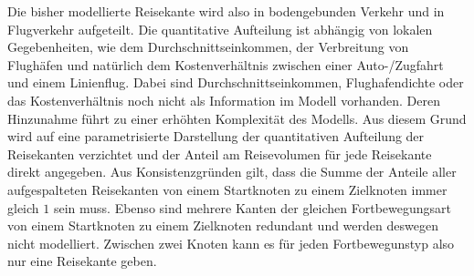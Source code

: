 Die bisher modellierte Reisekante wird also in bodengebunden Verkehr und in Flugverkehr aufgeteilt. Die quantitative Aufteilung ist abhängig von lokalen Gegebenheiten, wie dem Durchschnittseinkommen, der Verbreitung von Flughäfen und natürlich dem Kostenverhältnis zwischen einer Auto-/Zugfahrt und einem Linienflug. Dabei sind Durchschnittseinkommen, Flughafendichte oder das Kostenverhältnis noch nicht als Information im Modell vorhanden. Deren Hinzunahme führt zu einer erhöhten Komplexität des Modells. Aus diesem Grund wird auf eine parametrisierte Darstellung der quantitativen Aufteilung der Reisekanten verzichtet und der Anteil am Reisevolumen für jede Reisekante direkt angegeben. Aus Konsistenzgründen gilt, dass die Summe der Anteile aller aufgespalteten Reisekanten von einem Startknoten zu einem Zielknoten immer gleich $1$ sein muss. Ebenso sind mehrere Kanten der gleichen Fortbewegungsart von einem Startknoten zu einem Zielknoten redundant und werden deswegen nicht modelliert. Zwischen zwei Knoten kann es für jeden Fortbewegunstyp also nur eine Reisekante geben. 